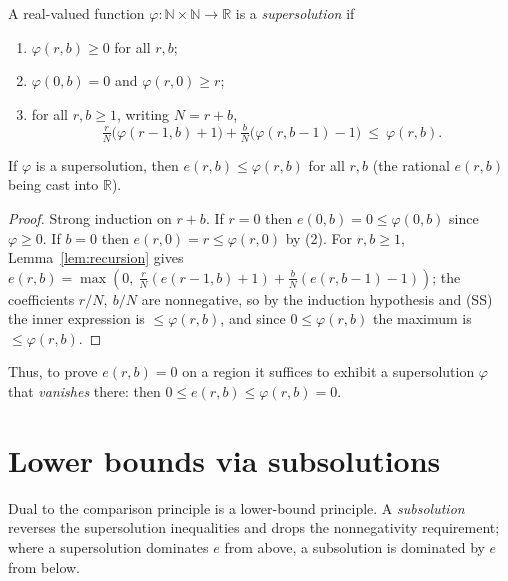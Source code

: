 \begin{definition}[Supersolution]\label{def:super}
\leanok
{}
A real-valued function $\varphi:\mathbb N\times\mathbb N\to\mathbb R$ is a
\emph{supersolution} if
\begin{enumerate}
  \item $\varphi(r,b)\ge 0$ for all $r,b$;
  \item $\varphi(0,b)=0$ and $\varphi(r,0)\ge r$;
  \item for all $r,b\ge1$, writing $N=r+b$,
  \[
    \tfrac{r}{N}\big(\varphi(r-1,b)+1\big)+\tfrac{b}{N}\big(\varphi(r,b-1)-1\big)
      \ \le\ \varphi(r,b). \tag{SS}
  \]
\end{enumerate}
\end{definition}

\begin{proposition}[Comparison]\label{prop:comparison}
\leanok
{}
If $\varphi$ is a supersolution, then $e(r,b)\le\varphi(r,b)$ for all $r,b$ (the
rational $e(r,b)$ being cast into $\mathbb R$).
\end{proposition}
\begin{proof}\leanok
Strong induction on $r+b$.
If $r=0$ then $e(0,b)=0\le\varphi(0,b)$ since $\varphi\ge0$.
If $b=0$ then $e(r,0)=r\le\varphi(r,0)$ by (2).
For $r,b\ge1$, Lemma~\ref{lem:recursion} gives
$e(r,b)=\max(0,\ \tfrac{r}{N}(e(r-1,b)+1)+\tfrac{b}{N}(e(r,b-1)-1))$;
the coefficients $r/N,\ b/N$ are nonnegative, so by the induction hypothesis and
(SS) the inner expression is $\le\varphi(r,b)$, and since $0\le\varphi(r,b)$ the
maximum is $\le\varphi(r,b)$.
\end{proof}

Thus, to prove $e(r,b)=0$ on a region it suffices to exhibit a supersolution
$\varphi$ that \emph{vanishes} there: then $0\le e(r,b)\le\varphi(r,b)=0$.

\section{Lower bounds via subsolutions}

Dual to the comparison principle is a lower-bound principle. A
\emph{subsolution} reverses the supersolution inequalities and drops the
nonnegativity requirement; where a supersolution dominates $e$ from above, a
subsolution is dominated by $e$ from below.

